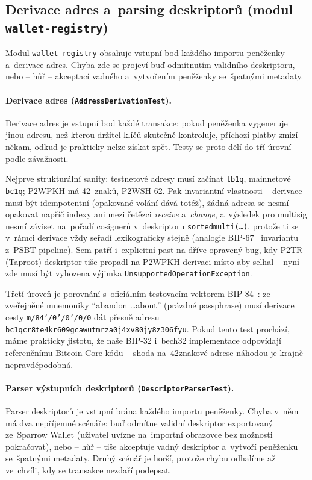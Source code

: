 \subsection[Derivace adres a~parsing deskriptorů]{Derivace adres
a~parsing deskriptorů (modul \texttt{wallet-registry})}
\label{subsec:test-registry}

Modul \texttt{wallet-registry} obsahuje vstupní bod každého importu
peněženky a~derivace adres. Chyba zde se projeví buď odmítnutím
validního deskriptoru, nebo -- hůř -- akceptací vadného a~vytvořením
peněženky se~špatnými metadaty.

\paragraph{Derivace adres (\texttt{AddressDerivationTest}).}
Derivace adres je vstupní bod každé transakce: pokud peněženka
vygeneruje jinou adresu, než kterou držitel klíčů skutečně kontroluje,
příchozí platby zmizí někam, odkud je prakticky nelze získat zpět.
Testy se proto dělí do tří úrovní podle závažnosti.

Nejprve strukturální sanity: testnetové adresy musí začínat \texttt{tb1q},
mainnetové \texttt{bc1q}; P2WPKH má 42~znaků, P2WSH 62. Pak invariantní
vlastnosti -- derivace musí být idempotentní (opakované volání dává
totéž), žádná adresa se nesmí opakovat napříč indexy ani mezi řetězci
\emph{receive} a~\emph{change}, a~výsledek pro multisig nesmí záviset
na~pořadí cosignerů v~deskriptoru \texttt{sortedmulti(\ldots)}, protože
ti se v~rámci derivace vždy seřadí lexikograficky stejně (analogie
BIP-67~\cite{BIP67} invariantu z~PSBT pipeline). Sem patří i~explicitní
past na dříve opravený bug, kdy P2TR (Taproot) deskriptor tiše propadl
na P2WPKH derivaci místo aby selhal -- nyní zde musí být vyhozena
výjimka
\texttt{Unsupported\allowbreak Operation\allowbreak Exception}.

Třetí úroveň je porovnání s~oficiálním testovacím vektorem
BIP-84~\cite{BIP84}: ze zveřejněné mnemoniky
\enquote{abandon \ldots about} (prázdné passphrase) musí derivace cesty
\texttt{m/84'/0'/0'/0/0} dát přesně adresu
\texttt{bc1qcr8te4kr609\allowbreak gcawutmrza0\allowbreak j4xv80jy8z306fyu}.
Pokud tento test prochází, máme prakticky jistotu, že naše BIP-32
i~bech32 implementace odpovídají referenčnímu Bitcoin Core kódu --
shoda na~42znakové adrese náhodou je krajně nepravděpodobná.

\paragraph{Parser výstupních deskriptorů
(\texttt{DescriptorParserTest}).}
Parser deskriptorů je vstupní brána každého importu peněženky.
Chyba v~něm má dva nepříjemné scénáře: buď odmítne validní deskriptor
exportovaný ze~Sparrow Wallet (uživatel uvízne na~importní obrazovce
bez možnosti pokračovat), nebo -- hůř -- tiše akceptuje vadný
deskriptor a~vytvoří peněženku se~špatnými metadaty. Druhý scénář
je horší, protože chybu odhalíme až ve~chvíli, kdy se transakce
nezdaří podepsat.

